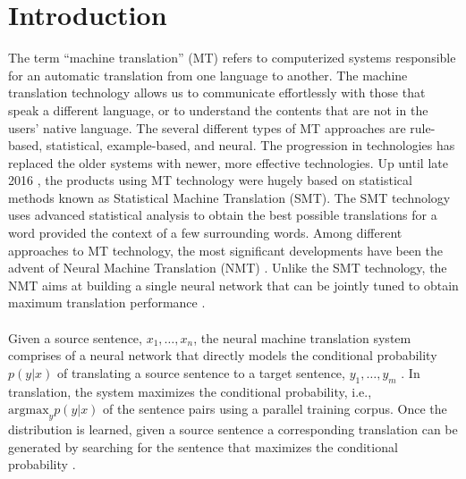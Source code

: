 \section{Introduction}
The term “machine translation” (MT) refers to computerized systems responsible for an automatic translation from one language to another. The machine translation technology allows us to communicate effortlessly with those that speak a different language, or to understand the contents that are not in the users’ native language. The several different types of MT approaches are  rule-based, statistical, example-based, and neural. The progression in technologies has replaced the older systems with newer, more effective technologies. Up until late 2016 \cite{semantix_mt}, the products using MT technology were hugely based on statistical methods known as Statistical Machine Translation (SMT). The SMT technology uses advanced statistical analysis to obtain the best possible translations for a word provided the context of a few surrounding words. Among different approaches to MT technology, the most significant developments have been the advent of Neural Machine Translation (NMT) \cite{memsource_mt}. Unlike the SMT technology, the NMT aims at building a single neural network that can be jointly tuned to obtain maximum translation performance \cite{bahdanau2014neural}.
\\\\
Given a source sentence, $x_1, \ldots, x_n$, the neural machine translation system comprises of a neural network that directly models the conditional probability $p(y|x)$ of translating a source sentence to a target sentence, $y_1, \ldots, y_m$ \cite{luong2015effective}. In translation, the system maximizes the conditional probability, i.e., $\text{argmax} _y p(y|x)$ of the sentence pairs using a parallel training corpus. Once the distribution is learned, given a source sentence a corresponding translation can be generated by searching for the sentence that maximizes the conditional probability \cite{bahdanau2014neural}. 

